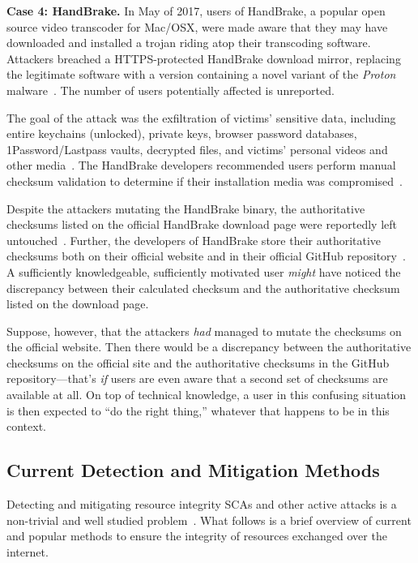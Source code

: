 \noindent\textbf{Case 4: HandBrake.} In May of 2017, users of HandBrake, a
popular open source video transcoder for Mac/OSX, were made aware that they may
have downloaded and installed a trojan riding atop their transcoding software.
Attackers breached a HTTPS-protected HandBrake download mirror, replacing the
legitimate software with a version containing a novel variant of the
\emph{Proton} malware~\cite{SCA-HB1}. The number of users potentially affected
is unreported.

The goal of the attack was the exfiltration of victims' sensitive data,
including entire keychains (unlocked), private keys, browser password databases,
1Password/Lastpass vaults, decrypted files, and victims' personal videos and
other media~\cite{SCA-HB1}. The HandBrake developers recommended users perform
manual checksum validation to determine if their installation media was
compromised~\cite{SCA-HB2}.

Despite the attackers mutating the HandBrake binary, the authoritative checksums
listed on the official HandBrake download page were reportedly left
untouched~\cite{SCA-HB2}. Further, the developers of HandBrake store their
authoritative checksums both on their official website and in their official
GitHub repository~\cite{SCA-HB2}. A sufficiently knowledgeable, sufficiently
motivated user \emph{might} have noticed the discrepancy between their
calculated checksum and the authoritative checksum listed on the download page.

Suppose, however, that the attackers \textit{had} managed to mutate the
checksums on the official website. Then there would be a discrepancy between the
authoritative checksums on the official site and the authoritative checksums in
the GitHub repository---that's \emph{if} users are even aware that a second set
of checksums are available at all. On top of technical knowledge, a user in this
confusing situation is then expected to ``do the right thing,'' whatever that
happens to be in this context.

\subsection{Current Detection and Mitigation Methods}

Detecting and mitigating resource integrity SCAs and other active attacks is a
non-trivial and well studied problem~\cite{MD5Header, HTTP1.1, HTTPS, SRI, LF,
OpenPGP1, DNSSEC, PKI}. What follows is a brief overview of current and popular
methods to ensure the integrity of resources exchanged over the internet.


